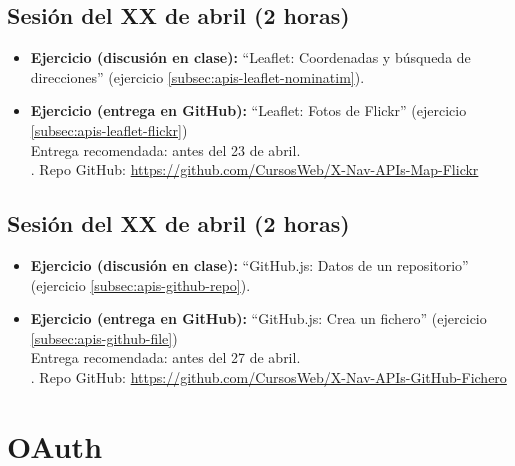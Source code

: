 \documentclass[a4paper,12pt]{report}
\begin{document}
\subsection{Sesión del XX de abril (2 horas)}

\begin{itemize}
\item \textbf{Ejercicio (discusión en clase):} ``Leaflet: Coordenadas y búsqueda de direcciones'' (ejercicio \ref{subsec:apis-leaflet-nominatim}).
\item \textbf{Ejercicio (entrega en GitHub):} ``Leaflet: Fotos de Flickr'' (ejercicio \ref{subsec:apis-leaflet-flickr})  \\
  Entrega recomendada: antes del 23 de abril. \\.
  Repo GitHub: \url{https://github.com/CursosWeb/X-Nav-APIs-Map-Flickr}
\end{itemize}


\subsection{Sesión del XX de abril (2 horas)}

\begin{itemize}
\item \textbf{Ejercicio (discusión en clase):} ``GitHub.js: Datos de un repositorio'' (ejercicio \ref{subsec:apis-github-repo}).
\item \textbf{Ejercicio (entrega en GitHub):} ``GitHub.js: Crea un fichero'' (ejercicio \ref{subsec:apis-github-file})  \\
  Entrega recomendada: antes del 27 de abril. \\.
  Repo GitHub: \url{https://github.com/CursosWeb/X-Nav-APIs-GitHub-Fichero}
\end{itemize}

\section{OAuth}
\end{document}
